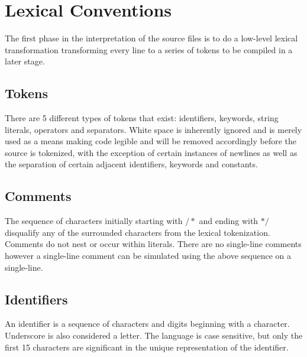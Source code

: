 \documentclass[12pt]{report}
\begin{document}
\section{Lexical Conventions}

\begin{doublespace}
The first phase in the interpretation of the source files is to do a low-level lexical transformation transforming every line to a series of tokens to be compiled in a later stage.
\end{doublespace}

\subsection{Tokens}

\begin{doublespace}
There are 5 different types of tokens that exist: identifiers, keywords, string literals, operators and separators. White space is inherently ignored and is merely used as a means making code legible and will be removed accordingly before the source is tokenized, with the exception of certain instances of newlines as well as the separation of certain adjacent identifiers, keywords and constants.
\end{doublespace}

\subsection{Comments}

\begin{doublespace}
The sequence of characters initially starting with $/*$ and ending with $*/$ disqualify any of the surrounded characters from the lexical tokenization. Comments do not nest or occur within literals. There are no single-line comments however a single-line comment can be simulated using the above sequence on a single-line.
\end{doublespace}

\subsection{Identifiers}

\begin{doublespace}
An identifier is a sequence of characters and digits beginning with a character. Underscore is also considered a letter. The language is case sensitive, but only the first 15 characters are significant in the unique representation of the identifier.
\end{doublespace}
\end{document}

